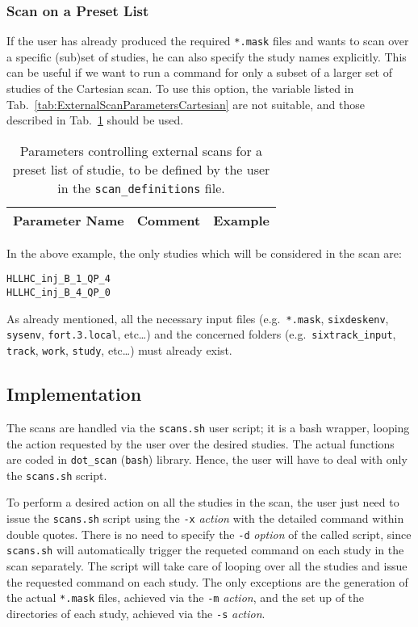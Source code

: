 \subsubsection{Scan on a Preset List}
If the user has already produced the required \texttt{*.mask} files
and wants to scan over a specific (sub)set of studies, he can also
specify the study names explicitly. This can be useful if we want
to run a command for only a subset of a larger set of studies of the
Cartesian scan. To use this option, the variable listed in
Tab.~\ref{tab:ExternalScanParametersCartesian} are not suitable, and
those described in Tab.~\ref{tab:ExternalScanParametersPresetList} should be used.
\begin{table}[h]
\begin{center}
  \caption{Parameters controlling external scans for a preset list
    of studie, to be defined by the user in the \texttt{scan\_definitions}
    file.}
    \label{tab:ExternalScanParametersPresetList}
    \begin{tabular}{|l|l|l|}
    \hline
    \rowcolor{blue!30}
    \textbf{Parameter Name} & \textbf{Comment} & \textbf{Example} \\
    \hline
    \end{tabular}
\end{center}
\end{table}
In the above example, the only studies which will be considered in the
scan are:
\begin{lstlisting}
HLLHC_inj_B_1_QP_4
HLLHC_inj_B_4_QP_0
\end{lstlisting}
As already mentioned, all the necessary input files (e.g.~\texttt{*.mask},
\texttt{sixdeskenv}, \texttt{sysenv}, \texttt{fort.3.local}, etc\ldots)
and the concerned folders (e.g.~\texttt{sixtrack\_input}, \texttt{track},
\texttt{work}, \texttt{study}, etc\ldots) must already exist.

\subsection{Implementation}
The scans are handled via the \texttt{scans.sh} user script;
it is a bash wrapper, looping the action requested by the
user over the desired studies. The actual
functions are coded in \texttt{dot\_scan} (\texttt{bash}) library.
Hence, the user will have to deal with only the \texttt{scans.sh}
script.

To perform a desired action on all the studies in the scan, the user
just need to issue the \texttt{scans.sh} script using the \texttt{-x}
\emph{action} with the detailed command within double quotes. There is no
need to specify the \texttt{-d} \emph{option} of the called script, since
\texttt{scans.sh} will automatically trigger the requeted command on each
study in the scan separately. The script
will take care of looping over all the studies and issue the requested
command on each study. The only exceptions are the generation
of the actual \texttt{*.mask} files, achieved via the \texttt{-m}
\emph{action}, and the set up of the directories of each study,
achieved via the \texttt{-s} \emph{action}.

